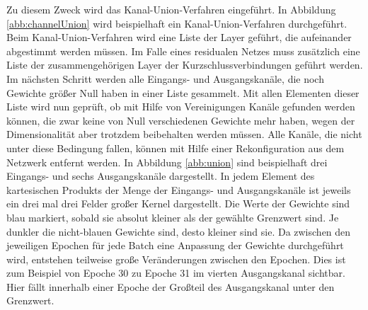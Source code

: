 Zu diesem Zweck wird das Kanal-Union-Verfahren eingeführt. In Abbildung \ref{abb:channelUnion} wird beispielhaft ein Kanal-Union-Verfahren durchgeführt. Beim Kanal-Union-Verfahren wird eine Liste der Layer geführt, die aufeinander abgestimmt werden müssen. Im Falle eines residualen Netzes muss zusätzlich eine Liste der zusammengehörigen Layer der Kurzschlussverbindungen geführt werden. Im nächsten Schritt werden alle Eingangs- und Ausgangskanäle, die noch Gewichte größer Null haben in einer Liste gesammelt. Mit allen Elementen dieser Liste wird nun geprüft, ob mit Hilfe von Vereinigungen Kanäle gefunden werden können, die zwar keine von Null verschiedenen Gewichte mehr haben, wegen der Dimensionalität aber trotzdem beibehalten werden müssen. Alle Kanäle, die nicht unter diese Bedingung fallen, können mit Hilfe einer Rekonfiguration aus dem Netzwerk entfernt werden. In Abbildung \ref{abb:union} sind beispielhaft drei Eingangs- und sechs Ausgangskanäle dargestellt. In jedem Element des kartesischen Produkts der Menge der Eingangs- und Ausgangskanäle ist jeweils ein drei mal drei Felder großer Kernel dargestellt. Die Werte der Gewichte sind blau markiert, sobald sie absolut kleiner als der gewählte Grenzwert sind. Je dunkler die nicht-blauen Gewichte sind, desto kleiner sind sie. Da zwischen den jeweiligen Epochen für jede Batch eine Anpassung der Gewichte durchgeführt wird, entstehen teilweise große Veränderungen zwischen den Epochen. Dies ist zum Beispiel von Epoche 30 zu Epoche 31 im vierten Ausgangskanal sichtbar. Hier fällt innerhalb einer Epoche der Großteil des Ausgangskanal unter den Grenzwert.
